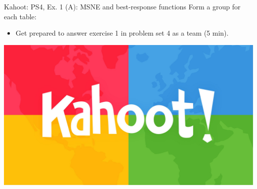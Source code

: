 \begin{frame}{Kahoot: PS4, Ex. 1 (A): MSNE and best-response functions}
  Form a group for each table:
  \begin{itemize}
    \item Get prepared to answer exercise 1 in problem set 4 as a team (5 min).
  \end{itemize}
  \includegraphics[width=\textwidth]{figures/kahoot}
\end{frame}
